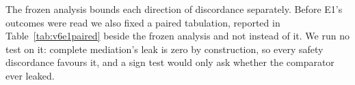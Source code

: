  The frozen analysis bounds each direction of discordance separately. Before E1's
outcomes were read we also fixed a paired tabulation, reported in Table~\ref{tab:v6e1paired} beside the frozen
analysis and not instead of it. We run no test on it: complete mediation's leak is zero by construction, so every
safety discordance favours it, and a sign test would only ask whether the comparator ever leaked.



